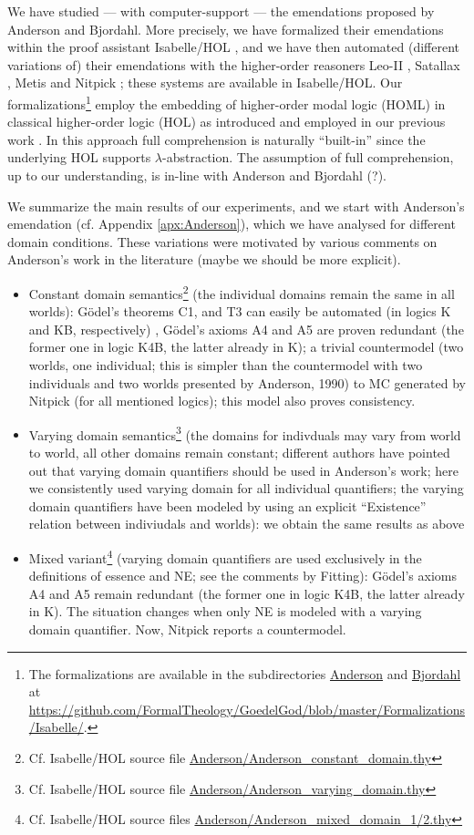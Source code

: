 \documentclass{birkjour}
\theoremstyle{definition}
\theoremstyle{remark}
\numberwithin{equation}{section}
\begin{document}
We have studied --- with computer-support --- the emendations proposed
by Anderson and Bjordahl.  More precisely, we have formalized their
emendations within the proof assistant Isabelle/HOL \cite{Isabelle},
and we have then automated (different variations of) their emendations
with the higher-order reasoners Leo-II \cite{C26}, Satallax
\cite{brown2012satallax}, Metis \cite{Hurd03first-orderproof} and
Nitpick \cite{BN10}; these systems are available in Isabelle/HOL.  Our
formalizations\footnote{The formalizations are available in the
  subdirectories \url{Anderson} and \url{Bjordahl} at
  \url{https://github.com/FormalTheology/GoedelGod/blob/master/Formalizations/Isabelle/}.}
employ the embedding of higher-order modal logic (HOML) in classical
higher-order logic (HOL) as introduced and employed in our previous
work \cite{J30,ECAI-2014}. In this approach full comprehension is
naturally ``built-in'' since the underlying HOL supports
$\lambda$-abstraction. The assumption of full comprehension, up to our
understanding, is
in-line with Anderson and Bjordahl (?).

We summarize the main results of our experiments, and we start with
Anderson's emendation (cf. Appendix \ref{apx:Anderson}), which we have
analysed for different domain conditions. These variations were
motivated by various comments on Anderson's work in the literature
(maybe we should be more explicit).
\begin{itemize}
\item Constant domain semantics\footnote{Cf. Isabelle/HOL source file
    \url{Anderson/Anderson_constant_domain.thy}} (the individual
  domains remain the same in all worlds): G\"odel's theorems C1, and
  T3 can easily be automated (in logics K and KB, respectively) ,
  G\"odel's axioms A4 and A5 are proven redundant (the former one in
  logic K4B, the latter already in K); a trivial countermodel (two
  worlds, one individual; this is simpler than
          the countermodel with two individuals and two worlds
          presented by Anderson, 1990) to MC generated by Nitpick (for all mentioned
  logics); this model also proves consistency.
\item Varying domain semantics\footnote{Cf. Isabelle/HOL source file
    \url{Anderson/Anderson_varying_domain.thy}} (the domains for
  indivduals may vary from world to world, all other domains remain
  constant; different authors have pointed out that varying domain
  quantifiers should be used in Anderson's work; here we consistently
  used varying domain for all individual quantifiers; the varying
  domain quantifiers have been modeled by using an explicit
  ``Existence'' relation between indiviudals and worlds): we obtain
  the same results as  above
\item Mixed variant\footnote{Cf. Isabelle/HOL source files
    \url{Anderson/Anderson_mixed_domain_1/2.thy}} (varying domain
  quantifiers are used exclusively in the definitions of essence and
  NE; see the comments by Fitting): G\"odel's axioms A4 and A5 remain
  redundant (the former one in
  logic K4B, the latter already in K). The situation changes when only
  NE is modeled with a varying domain quantifier. Now, Nitpick reports
  a countermodel. 
\end{itemize}
 
\end{document}

